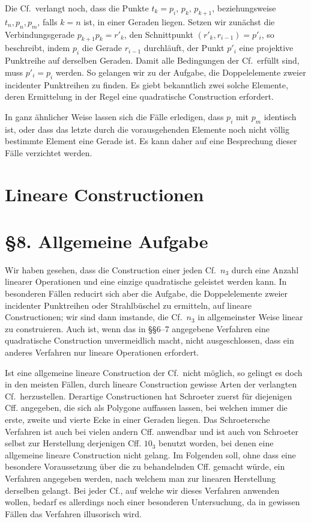 \documentclass[11pt]{article}
\newcommand{\Cf}{\textup{Cf.}}
\begin{document}
Die \Cf\ verlangt noch, dass die Punkte $t_k=p_i$, $p_k$, $p_{k+1}$, beziehungsweise $t_n,p_n,p_m$, falls $k=n$ ist, in einer Geraden liegen. Setzen wir zunächst die Verbindungsgerade $p_{k+1}p_k=r'_k$, den Schnittpunkt $(r'_k,r_{i-1})=p'_i$, so beschreibt, indem $p_i$ die Gerade $r_{i-1}$ durchläuft, der Punkt $p'_i$ eine projektive Punktreihe auf derselben Geraden. Damit alle Bedingungen der \Cf\ erfüllt sind, muss $p'_i=p_i$ werden. So gelangen wir zu der Aufgabe, die Doppelelemente zweier incidenter Punktreihen zu finden. Es giebt bekanntlich zwei solche Elemente, deren Ermittelung in der Regel eine quadratische Construction erfordert.

In ganz ähnlicher Weise lassen sich die Fälle erledigen, dass $p_i$ mit $p_m$ identisch ist, oder dass das letzte durch die vorausgehenden Elemente noch nicht völlig bestimmte Element eine Gerade ist. Es kann daher auf eine Besprechung dieser Fälle verzichtet werden.

\section*{Lineare Constructionen}
\section*{\S 8. Allgemeine Aufgabe}
Wir haben gesehen, dass die Construction einer jeden \Cf\ $n_3$ durch eine Anzahl linearer Operationen und eine einzige quadratische geleistet werden kann. In besonderen Fällen reducirt sich aber die Aufgabe, die Doppelelemente zweier incidenter Punktreihen oder Strahlbüschel zu ermitteln, auf lineare Constructionen; wir sind dann imstande, die \Cf\ $n_3$ in allgemeinster Weise linear zu construieren. Auch ist, wenn das in \S\S 6--7 angegebene Verfahren eine quadratische Construction unvermeidlich macht, nicht ausgeschlossen, dass ein anderes Verfahren nur lineare Operationen erfordert.

Ist eine allgemeine lineare Construction der \Cf\ nicht möglich, so gelingt es doch in den meisten Fällen, durch lineare Construction gewisse Arten der verlangten \Cf\ herzustellen. Derartige Constructionen hat Schroeter zuerst für diejenigen Cff. angegeben, die sich als Polygone auffassen lassen, bei welchen immer die erste, zweite und vierte Ecke in einer Geraden liegen. Das Schroetersche Verfahren ist auch bei vielen andern Cff. anwendbar und ist auch von Schroeter selbst zur Herstellung derjenigen Cff. $10_3$ benutzt worden, bei denen eine allgemeine lineare Construction nicht gelang. Im Folgenden soll, ohne dass eine besondere Voraussetzung über die zu behandelnden Cff. gemacht würde, ein Verfahren angegeben werden, nach welchem man zur linearen Herstellung derselben gelangt. Bei jeder \Cf, auf welche wir dieses Verfahren anwenden wollen, bedarf es allerdings noch einer besonderen Untersuchung, da in gewissen Fällen das Verfahren illusorisch wird.
\end{document}
